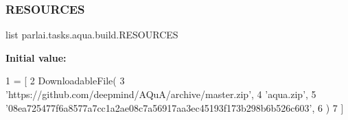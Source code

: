 \subsubsection{\texorpdfstring{R\+E\+S\+O\+U\+R\+C\+ES}{RESOURCES}}
{\footnotesize\ttfamily list parlai.\+tasks.\+aqua.\+build.\+R\+E\+S\+O\+U\+R\+C\+ES}

{\bfseries Initial value\+:}
\begin{DoxyCode}
1 =  [
2     DownloadableFile(
3         \textcolor{stringliteral}{'https://github.com/deepmind/AQuA/archive/master.zip'},
4         \textcolor{stringliteral}{'aqua.zip'},
5         \textcolor{stringliteral}{'08ea725477f6a8577a7cc1a2ae08c7a56917aa3ec45193f173b298b6b526c603'},
6     )
7 ]
\end{DoxyCode}

